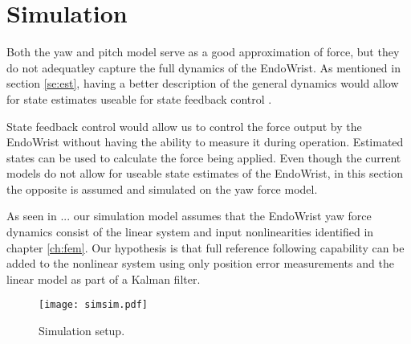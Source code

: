 \section{Simulation}
Both the yaw and pitch model serve as a good approximation of force, but they do not adequatley capture the full dynamics of the EndoWrist.
As mentioned in section \ref{se:est}, having a better description of the general dynamics would allow for state estimates useable for state feedback control \cite{yue2004state}.

State feedback control would allow us to control the force output by the EndoWrist without having the ability to measure it during operation.
Estimated states can be used to calculate the force being applied.
Even though the current models do not allow for useable state estimates of the EndoWrist, in this section the opposite is assumed and simulated on the yaw force model.

As seen in ... our simulation model assumes that the EndoWrist yaw force dynamics consist of the linear system and input nonlinearities identified in chapter \ref{ch:fem}.
Our hypothesis is that full reference following capability can be added to the nonlinear system using only position error measurements and the linear model as part of a Kalman filter.

\begin{figure}[H]
\centering
\texttt{[image: simsim.pdf]}
\caption{Simulation setup.}
\label{figlowpass}
\end{figure}